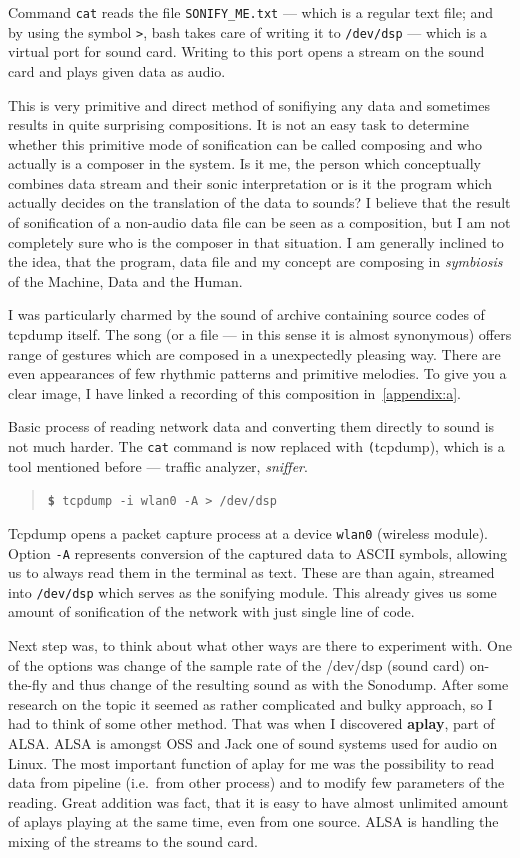 \documentclass[12pt,a4paper,oneside]{report}
\begin{document}
Command \texttt{cat} reads the file \texttt{SONIFY\_ME.txt} --- which is a regular text file; and by using the symbol \texttt{>}, bash takes care of writing it to \texttt{/dev/dsp} --- which is a virtual port for sound card. Writing to this port opens a stream on the sound card and plays given data as audio.

This is very primitive and direct method of sonifiying any data and sometimes results in quite surprising compositions. It is not an easy task to determine whether this primitive mode of sonification can be called composing and who actually is a composer in the system. Is it me, the person which conceptually combines data stream and their sonic interpretation or is it the program which actually decides on the translation of the data to sounds? I believe that the result of sonification of a non-audio data file can be seen as a composition, but I am not completely sure who is the composer in that situation. I am generally inclined to the idea, that the program, data file and my concept are composing in \emph{symbiosis} of the Machine, Data and the Human.

I was particularly charmed by the sound of archive containing source codes of tcpdump itself. The song (or a file --- in this sense it is almost synonymous) offers range of gestures which are composed in a unexpectedly pleasing way. There are even appearances of few rhythmic patterns and primitive melodies. To give you a clear image, I have linked a recording of this composition in~\autoref{appendix:a}.

Basic process of reading network data and converting them directly to sound is not much harder. The \texttt{cat} command is now replaced with \texttt(tcpdump), which is a tool mentioned before --- traffic analyzer, \emph{sniffer}.
\begin{quotation}
	\texttt{\textbf{\$} tcpdump -i wlan0 -A > /dev/dsp} 
\end{quotation}

Tcpdump opens a packet capture process at a device \texttt{wlan0} (wireless module). Option \texttt{-A} represents conversion of the captured data to ASCII symbols, allowing us to always read them in the terminal as text. These are than again, streamed into \texttt{/dev/dsp} which serves as the sonifying module. This already gives us some amount of sonification of the network with just single line of code. 

Next step was, to think about what other ways are there to experiment with. One of the options was change of the sample rate of the /dev/dsp (sound card) on-the-fly and thus change of the resulting sound as with the Sonodump. After some research on the topic it seemed as rather complicated and bulky approach, so I had to think of some other method. That was when I discovered \textbf{aplay}, part of ALSA. ALSA is amongst OSS and Jack one of sound systems used for audio on Linux. The most important function of aplay for me was the possibility to read data from pipeline (i.e.\ from other process) and to modify few parameters of the reading. Great addition was fact, that it is easy to have almost unlimited amount of aplays playing at the same time, even from one source. ALSA is handling the mixing of the streams to the sound card.
\end{document}
